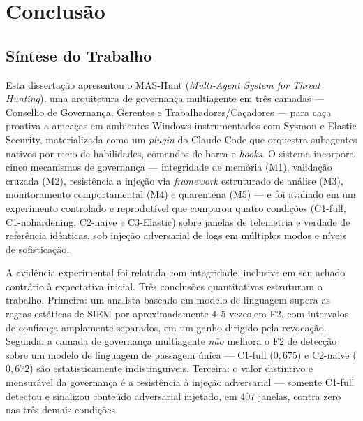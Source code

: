 
\chapter{Conclusão}
\label{cap:conclusao}

\section{Síntese do Trabalho}
\label{sec:concl-sintese}

Esta dissertação apresentou o MAS-Hunt (\textit{Multi-Agent System for Threat
Hunting}), uma arquitetura de governança multiagente em três camadas --- Conselho
de Governança, Gerentes e Trabalhadores/Caçadores --- para caça proativa a
ameaças em ambientes Windows instrumentados com Sysmon e Elastic Security,
materializada como um \textit{plugin} do Claude Code que orquestra subagentes
nativos por meio de habilidades, comandos de barra e \textit{hooks}. O sistema
incorpora cinco mecanismos de governança --- integridade de memória (M1),
validação cruzada (M2), resistência a injeção via \textit{framework} estruturado
de análise (M3), monitoramento comportamental (M4) e quarentena (M5) --- e foi
avaliado em um experimento controlado e reprodutível que comparou quatro condições
(C1-full, C1-nohardening, C2-naive e C3-Elastic) sobre janelas de telemetria e
verdade de referência idênticas, sob injeção adversarial de logs em múltiplos
modos e níveis de sofisticação.

A evidência experimental foi relatada com integridade, inclusive em seu achado
contrário à expectativa inicial. Três conclusões quantitativas estruturam o
trabalho. Primeira: um analista baseado em modelo de linguagem supera as regras
estáticas de SIEM por aproximadamente $4{,}5$ vezes em F2, com intervalos de
confiança amplamente separados, em um ganho dirigido pela revocação. Segunda: a
camada de governança multiagente \emph{não} melhora o F2 de detecção sobre um
modelo de linguagem de passagem única --- C1-full ($0{,}675$) e C2-naive
($0{,}672$) são estatisticamente indistinguíveis. Terceira: o valor distintivo e
mensurável da governança é a resistência à injeção adversarial --- somente
C1-full detectou e sinalizou conteúdo adversarial injetado, em 407 janelas, contra
zero nas três demais condições.

